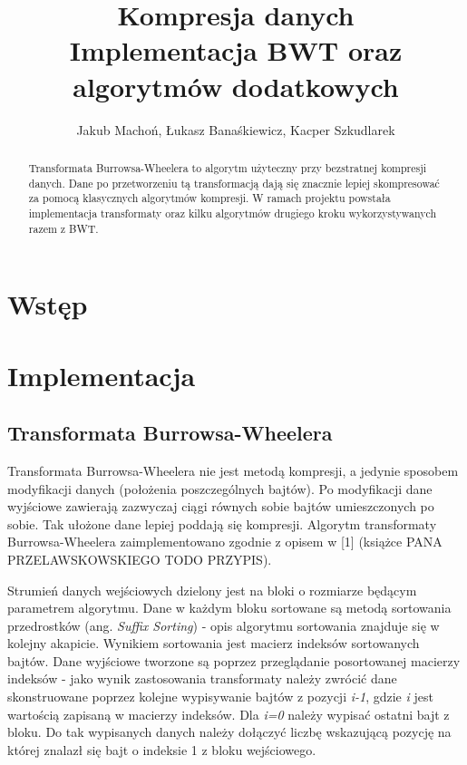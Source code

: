 \documentclass[a4paper,12pt]{article}
\begin{document}
\title{{\small Kompresja danych}\\Implementacja BWT oraz algorytmów dodatkowych}
\author{Jakub Machoń, Łukasz Banaśkiewicz, Kacper Szkudlarek}

\maketitle

\begin{abstract}
Transformata Burrowsa-Wheelera to algorytm użyteczny przy bezstratnej kompresji danych. Dane po przetworzeniu tą transformacją dają się znacznie lepiej skompresować za pomocą klasycznych algorytmów kompresji. W ramach projektu powstała implementacja transformaty oraz kilku algorytmów drugiego kroku wykorzystywanych razem z BWT.
\end{abstract}


\section{Wstęp}


\section{Implementacja}

\subsection{Transformata Burrowsa-Wheelera}

Transformata Burrowsa-Wheelera nie jest metodą kompresji, a jedynie
sposobem modyfikacji danych (położenia poszczególnych bajtów). Po
modyfikacji dane wyjściowe zawierają zazwyczaj ciągi równych sobie
bajtów umieszczonych po sobie. Tak ułożone dane lepiej poddają się
kompresji. Algorytm transformaty Burrowsa-Wheelera zaimplementowano
zgodnie z opisem w {[}1{]} (książce PANA PRZELAWSKOWSKIEGO TODO PRZYPIS).

Strumień danych wejściowych dzielony jest na bloki o rozmiarze będącym
parametrem algorytmu. Dane w każdym bloku sortowane są metodą sortowania
przedrostków (ang. \emph{Suffix Sorting}) - opis algorytmu sortowania
znajduje się w kolejny akapicie. Wynikiem sortowania jest macierz
indeksów sortowanych bajtów. Dane wyjściowe tworzone są poprzez przeglądanie
posortowanej macierzy indeksów - jako wynik zastosowania transformaty
należy zwrócić dane skonstruowane poprzez kolejne wypisywanie bajtów
z pozycji \emph{i-1}, gdzie \emph{i} jest wartością zapisaną w macierzy
indeksów. Dla \emph{i=0} należy wypisać ostatni bajt z bloku. Do tak
wypisanych danych należy dołączyć liczbę wskazującą pozycję na której
znalazł się bajt o indeksie 1 z bloku wejściowego.
\end{document}

